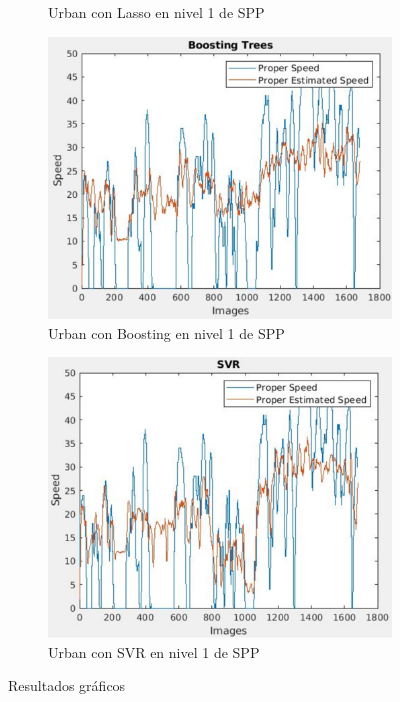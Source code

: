 \begin{figure}[H]
\begin{subfigure}[b]{0.425\linewidth}
    \caption{Urban con Lasso en nivel 1 de \ac{SPP}}
  \end{subfigure}
    \begin{subfigure}[b]{0.45\linewidth}
    \includegraphics[width=\linewidth]{Figuras/Boosting_Urban(Nivel_1).eps}
    \caption{Urban con Boosting en nivel 1 de \ac{SPP}}
  \end{subfigure}
    \begin{subfigure}[b]{0.45\linewidth}
    \includegraphics[width=\linewidth]{Figuras/SVR_Urban(Nivel_1).eps}
    \caption{Urban con SVR en nivel 1 de \ac{SPP}}
  \end{subfigure}
  \caption{Resultados gráficos}
\end{figure}

